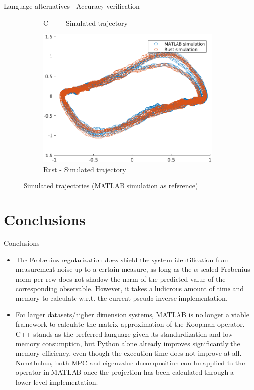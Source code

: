 \documentclass{beamer}
\begin{document}
\begin{frame}{Language alternatives - Accuracy verification}
\begin{figure}
\begin{subfigure}[b]{0.3\textwidth}
            \caption{C++ - Simulated trajectory}
            \label{fig:sim_cpp}
        \end{subfigure}
        \hfill
        \begin{subfigure}[b]{0.3\textwidth}
            \centering
            \includegraphics[width=\textwidth]{Rust_Sim.png}
            \caption{Rust - Simulated trajectory}
            \label{fig:sim_rust}
        \end{subfigure}
        \caption{Simulated trajectories (MATLAB simulation as reference)}
        \label{fig:implementations}
    \end{figure}
\end{frame}


\section{Conclusions}

\begin{frame}{Conclusions}
    \begin{itemize}
        \item The Frobenius regularization does shield the system identification from measurement noise up to a certain measure, as long as the $\alpha$-scaled Frobenius norm per row does not shadow the norm of the predicted value of the corresponding observable. However, it takes a ludicrous amount of time and memory to calculate w.r.t. the current pseudo-inverse implementation.
        \item For larger datasets/higher dimension systems, MATLAB is no longer a viable framework to calculate the matrix approximation of the Koopman operator. C++ stands as the preferred language given its standardization and low memory consumption, but Python alone already improves significantly the memory efficiency, even though the execution time does not improve at all. Nonetheless, both MPC and eigenvalue decomposition can be applied to the operator in MATLAB once the projection has been calculated through a lower-level implementation.
    \end{itemize}
\end{frame}
\end{document}
